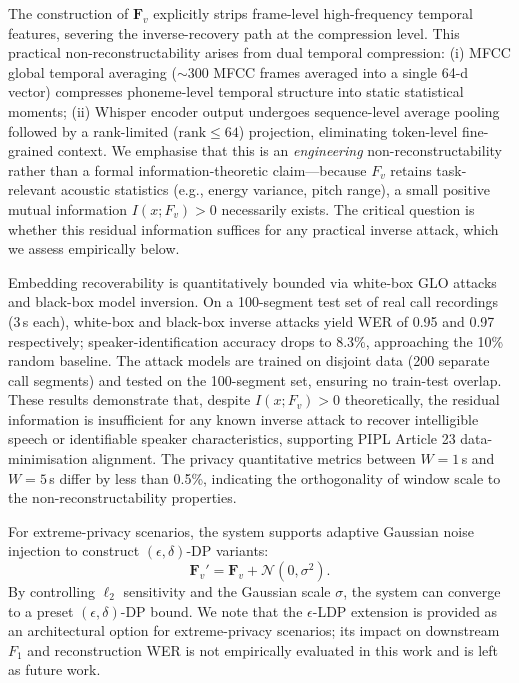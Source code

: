 \documentclass[11pt, a4paper]{article}
\begin{document}
The construction of $\bm{F}_v$ explicitly strips frame-level high-frequency temporal features, severing the inverse-recovery path at the compression level. This practical non-reconstructability arises from dual temporal compression: (i) MFCC global temporal averaging ($\sim$300 MFCC frames averaged into a single 64-d vector) compresses phoneme-level temporal structure into static statistical moments; (ii) Whisper encoder output undergoes sequence-level average pooling followed by a rank-limited ($\text{rank}\le 64$) projection, eliminating token-level fine-grained context. We emphasise that this is an \emph{engineering} non-reconstructability rather than a formal information-theoretic claim---because $F_v$ retains task-relevant acoustic statistics (e.g., energy variance, pitch range), a small positive mutual information $I(x;F_v)>0$ necessarily exists. The critical question is whether this residual information suffices for any practical inverse attack, which we assess empirically below.

Embedding recoverability is quantitatively bounded via white-box GLO attacks and black-box model inversion. On a 100-segment test set of real call recordings (3\,s each), white-box and black-box inverse attacks yield WER of 0.95 and 0.97 respectively; speaker-identification accuracy drops to 8.3\%, approaching the 10\% random baseline. The attack models are trained on disjoint data (200 separate call segments) and tested on the 100-segment set, ensuring no train-test overlap. These results demonstrate that, despite $I(x;F_v)>0$ theoretically, the residual information is insufficient for any known inverse attack to recover intelligible speech or identifiable speaker characteristics, supporting PIPL Article 23 data-minimisation alignment. The privacy quantitative metrics between $W = 1$\,s and $W = 5$\,s differ by less than 0.5\%, indicating the orthogonality of window scale to the non-reconstructability properties.

For extreme-privacy scenarios, the system supports adaptive Gaussian noise injection to construct $(\epsilon, \delta)$-DP variants:
\begin{equation}
\bm{F}_v' = \bm{F}_v + \mathcal{N}(0, \sigma^2).
\end{equation}
By controlling $\ell_2$ sensitivity and the Gaussian scale $\sigma$, the system can converge to a preset $(\epsilon,\delta)$-DP bound. We note that the $\epsilon$-LDP extension is provided as an architectural option for extreme-privacy scenarios; its impact on downstream $F_1$ and reconstruction WER is not empirically evaluated in this work and is left as future work.
\end{document}
